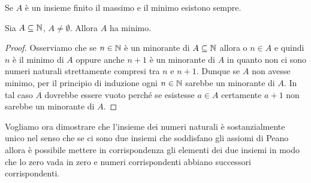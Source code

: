 Se $A$ è un insieme finito il massimo e il minimo 
esistono sempre. 

\begin{theorem}
  \label{th:buon_ordinamento}
  Sia $A\subseteq {\mathbb N}$, $A\neq \emptyset$. 
  Allora $A$ ha minimo.
\end{theorem}
%
\begin{proof}
  Osserviamo che se $n\in {\mathbb N}$ è un minorante di $A\subseteq {\mathbb N}$ 
  allora o $n\in A$ e quindi $n$ è il minimo di $A$
  oppure anche $n+1$ è un minorante di $A$ in quanto 
  non ci sono numeri naturali strettamente compresi tra $n$ e $n+1$.
  Dunque se $A$ non avesse minimo, per il principio di induzione 
  ogni $n\in{\mathbb N}$ sarebbe un minorante di $A$.
  In tal caso $A$ dovrebbe essere vuoto perché se esistesse $a\in A$ 
  certamente $a+1$ non sarebbe un minorante di $A$.
\end{proof}

Vogliamo ora dimostrare che l'insieme dei numeri naturali è sostanzialmente 
unico nel senso che se ci sono due insiemi che soddisfano gli assiomi di 
Peano allora è possibile mettere in corrispondenza gli elementi dei due insiemi 
in modo che lo zero vada in zero e numeri corrispondenti abbiano successori 
corrispondenti.

